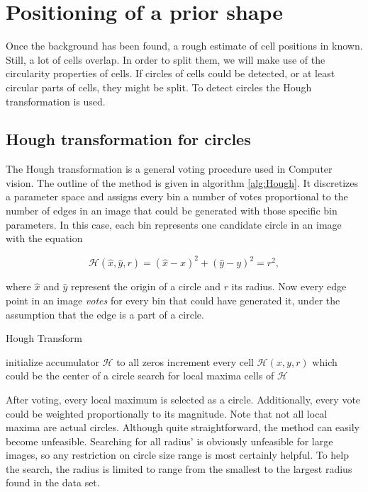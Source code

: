 \section{Positioning of a prior shape}

Once the background has been found, a rough estimate of cell positions in known. Still, a lot of cells overlap. In order to split them, we will make use of the circularity properties of cells. If circles of cells could be detected, or at least circular parts of cells, they might be split. To detect circles the Hough transformation is used.

\subsection{Hough transformation for circles}

The Hough transformation is a general voting procedure used in Computer vision. The outline of the method is given in algorithm \ref{alg:Hough}. It discretizes a parameter space and assigns every bin a number of votes proportional to the number of edges in an image that could be generated with those specific bin parameters. In this case, each bin represents one candidate circle in an image with the equation 

\begin{equation}
	\mathcal{H}(\hat{x}, \hat{y}, r) = (\hat{x} - x)^2 + (\hat{y} - y)^2 = r^2,
\end{equation}

where  $\hat{x}$ and $\hat{y}$ represent the origin of a circle and $r$ its radius. Now every edge point in an image \textit{votes} for every bin that could have generated it, under the assumption that the edge is a part of a circle. \\

\begin{algorithm}
	\caption{Hough Transform}
 	\label{alg:Hough}
 	\begin{algorithmic}[1]
 		\State initialize accumulator $\mathcal{H}$ to all zeros
 			\State increment every cell $\mathcal{H}(x,y,r)$ which could be the center of a circle
 		\EndFor
 		\State search for local maxima cells of $\mathcal{H}$
 	\EndFunction
\end{algorithmic}
\end{algorithm}

After voting, every local maximum is selected as a circle. Additionally, every vote could be weighted proportionally to its magnitude. Note that not all local maxima are actual circles. Although quite straightforward, the method can easily become unfeasible. Searching for all radius' is obviously unfeasible for large images, so any restriction on circle size range is most certainly helpful. To help the search, the radius is limited to range from the smallest to the largest radius found in the data set. \\

